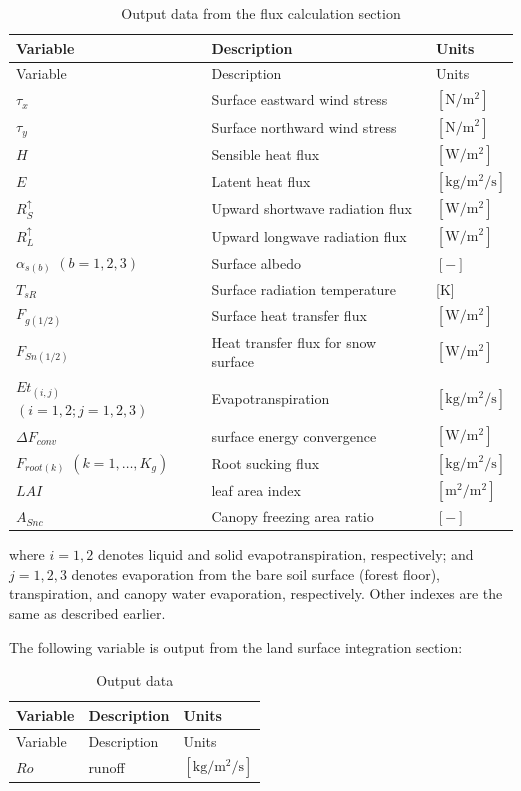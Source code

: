 \begin{longtable}[]{@{}lll@{}}
\caption{Output data from the flux calculation section}\tabularnewline
\toprule
Variable & Description & Units \\
\midrule
\endfirsthead
\toprule
Variable & Description & Units \\
\midrule
\endhead
\(\tau_x\) & Surface eastward wind stress & \(\mathrm{[N/m^2]}\) \\
\(\tau_y\) & Surface northward wind stress & \(\mathrm{[N/m^2]}\) \\
\(H\) & Sensible heat flux & \(\mathrm{[W/m^2]}\) \\
\(E\) & Latent heat flux & \(\mathrm{[kg/m^2/s]}\) \\
\(R^{\uparrow}_S\) & Upward shortwave radiation flux & \(\mathrm{[W/m^2]}\) \\
\(R^{\uparrow}_L\) & Upward longwave radiation flux & \(\mathrm{[W/m^2]}\) \\
\(\alpha_{s(b)}\) \((b=1,2,3)\) & Surface albedo & \(\mathrm{[-]}\) \\
\(T_{sR}\) & Surface radiation temperature & {[}K{]} \\
\(F_{g(1/2)}\) & Surface heat transfer flux & \(\mathrm{[W/m^2]}\) \\
\(F_{Sn(1/2)}\) & Heat transfer flux for snow surface & \(\mathrm{[W/m^2]}\) \\
\(Et_{(i,j)}\) \((i=1,2;j=1,2,3)\) & Evapotranspiration & \(\mathrm{[kg/m^2/s]}\) \\
\(\Delta F_{conv}\) & surface energy convergence & \(\mathrm{[W/m^2]}\) \\
\(F_{root(k)}\) \((k=1,\ldots,K_g)\) & Root sucking flux & \(\mathrm{[kg/m^2/s]}\) \\
\(LAI\) & leaf area index & \(\mathrm{[m^2/m^2]}\) \\
\(A_{Snc}\) & Canopy freezing area ratio & \(\mathrm{[-]}\) \\
\bottomrule
\end{longtable}

where \(i=1,2\) denotes liquid and solid evapotranspiration, respectively; and \(j=1,2,3\) denotes evaporation from the bare soil surface (forest floor), transpiration, and canopy water evaporation,
respectively. Other indexes are the same as described earlier.

The following variable is output from the land surface integration section:

\begin{longtable}[]{@{}lll@{}}
\caption{Output data}\tabularnewline
\toprule
Variable & Description & Units \\
\midrule
\endfirsthead
\toprule
Variable & Description & Units \\
\midrule
\endhead
\(Ro\) & runoff & \(\mathrm{[kg/m^2/s]}\) \\
\bottomrule
\end{longtable}

